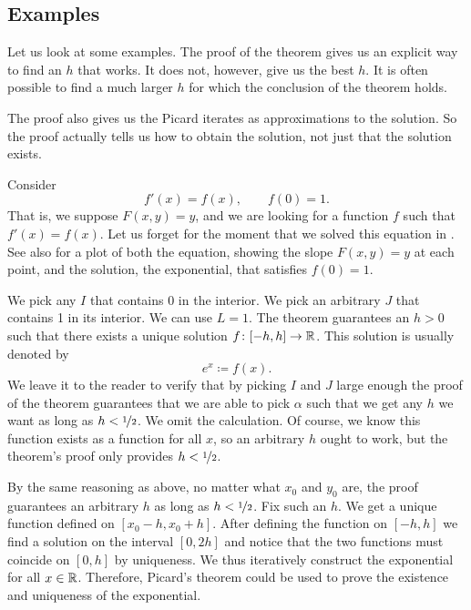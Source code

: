 \subsection{Examples}

Let us look at some examples.  The proof of the theorem 
gives us an explicit way to find an $h$ that works.  It does not, however, give
us the best $h$.  It is often possible to find a much larger $h$ for
which the conclusion of the theorem holds.

The proof also gives us the Picard iterates as approximations to the
solution.  So the proof actually tells us how to obtain
the solution, not just that the solution exists.

\begin{example} \label{example:picardexponential}
Consider
\begin{equation*}
f'(x) = f(x), \qquad f(0) = 1 .
\end{equation*}
That is, we suppose $F(x,y) = y$, and we are looking for a function 
$f$ such that $f'(x) = f(x)$.
Let us forget for the moment that we solved this equation in 
.  See also  for a plot of
both the equation, showing
the slope $F(x,y)=y$ at each point, and the solution,
the exponential, that satisfies $f(0)=1$.

We pick any $I$ that contains 0
in the interior.
We pick an arbitrary $J$ that contains 1 in its interior.  We can
use $L = 1$.
The theorem guarantees an $h > 0$ such that
there exists a unique solution $f \colon [-h,h] \to {\mathbb{R}}$.  This solution
is usually denoted by
\begin{equation*}
e^x \coloneqq f(x) .
\end{equation*}
We leave it to the reader to verify that by picking $I$ and $J$
large enough the proof of the theorem guarantees that
we are able to pick $\alpha$ such that we get any
$h$ we want as long as $h < \nicefrac{1}{2}$.  We omit the calculation.
Of course, we know %
this function exists
as a function for all $x$, so an arbitrary $h$ ought to work, but the
theorem's proof only provides $h < \nicefrac{1}{2}$.

By the same reasoning as above,
no matter what $x_0$ and $y_0$ are,
the proof guarantees an arbitrary $h$ as long as $h < \nicefrac{1}{2}$.
Fix such an $h$.
We get a unique function defined on $[x_0-h,x_0+h]$.  After defining the
function on $[-h,h]$ we find a solution on the interval $[0,2h]$
and notice that the two functions must coincide on $[0,h]$ by uniqueness.
We thus iteratively construct the exponential for all $x \in {\mathbb{R}}$.
Therefore, Picard's theorem could be used to prove the existence and uniqueness
of the exponential.


\end{example}
